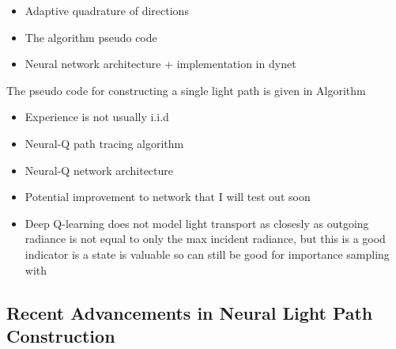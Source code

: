 \documentclass[../dissertation.tex]{subfiles}
\begin{document}
\begin{itemize}
\item Adaptive quadrature of directions
\item The algorithm pseudo code
\item Neural network architecture + implementation in dynet
\end{itemize}

The pseudo code for constructing a single light path is given in Algorithm

\begin{itemize}
\item Experience is not usually i.i.d
\item Neural-Q path tracing algorithm
\item Neural-Q network architecture
\item Potential improvement to network that I will test out soon 
\item Deep Q-learning does not model light transport as closesly as outgoing radiance is not equal to only the max incident radiance, but this is a good indicator is a state is valuable so can still be good for importance sampling with
\end{itemize}

\subsection{Recent Advancements in Neural Light Path Construction}
\end{document}
